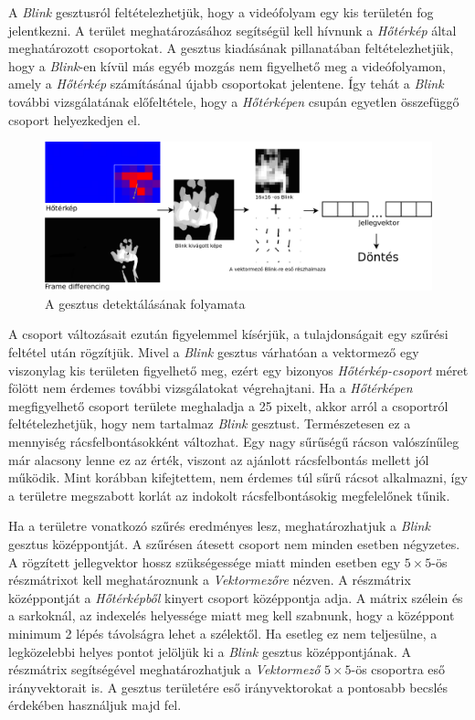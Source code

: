 A \textit{Blink} gesztusról feltételezhetjük, hogy a videófolyam egy kis területén fog jelentkezni. A terület meghatározásához segítségül kell hívnunk a \textit{Hőtérkép} által meghatározott csoportokat. A gesztus kiadásának pillanatában feltételezhetjük, hogy a \textit{Blink}-en kívül más egyéb mozgás nem figyelhető meg a videófolyamon, amely a \textit{Hőtérkép} számításánal újabb csoportokat jelentene. Így tehát a \textit{Blink} további vizsgálatának előfeltétele, hogy a \textit{Hőtérképen} csupán egyetlen összefüggő csoport helyezkedjen el.
\begin{figure}[h]
\centering
\includegraphics[width=\textwidth]{images/blink_flow.png}
\caption{A gesztus detektálásának folyamata}
\label{fig:blinkflow}
\end{figure}

A csoport változásait ezután figyelemmel kísérjük, a tulajdonságait egy szűrési feltétel után rögzítjük. Mivel a \textit{Blink} gesztus várhatóan a vektormező egy viszonylag kis területen figyelhető meg, ezért egy bizonyos \textit{Hőtérkép-csoport} méret fölött nem érdemes további vizsgálatokat végrehajtani. Ha a \textit{Hőtérképen} megfigyelhető csoport területe meghaladja a 25 pixelt, akkor arról a csoportról feltételezhetjük, hogy nem tartalmaz \textit{Blink} gesztust. Természetesen ez a mennyiség rácsfelbontásokként változhat. Egy nagy sűrűségű rácson valószínűleg már alacsony lenne ez az érték, viszont az ajánlott rácsfelbontás mellett jól működik. Mint korábban kifejtettem, nem érdemes túl sűrű rácsot alkalmazni, így a területre megszabott korlát az indokolt rácsfelbontásokig megfelelőnek tűnik.

Ha a területre vonatkozó szűrés eredményes lesz, meghatározhatjuk a \textit{Blink} gesztus középpontját. A szűrésen átesett csoport nem minden esetben négyzetes. A rögzített jellegvektor hossz szükségessége miatt minden esetben egy $5\times5$-ös részmátrixot kell meghatároznunk a \textit{Vektormezőre} nézven. A részmátrix középpontját a \textit{Hőtérképből} kinyert csoport középpontja adja. A mátrix szélein és a sarkoknál, az indexelés helyessége miatt meg kell szabnunk, hogy a középpont minimum 2 lépés távolságra lehet a szélektől. Ha esetleg ez nem teljesülne, a legközelebbi helyes pontot jelöljük ki a \textit{Blink} gesztus középpontjának. A részmátrix segítségével meghatározhatjuk a \textit{Vektormező} $5\times5$-ös csoportra eső irányvektorait is. A gesztus területére eső irányvektorokat a pontosabb becslés érdekében használjuk majd fel.


